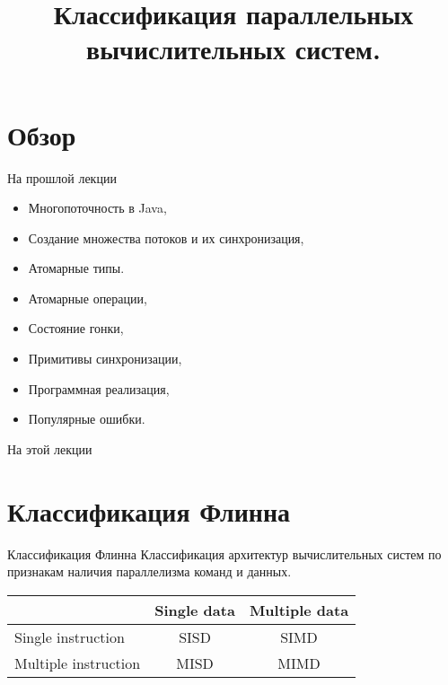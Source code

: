 

\title{Классификация параллельных вычислительных систем.}



\begin{frame}
\titlepage
\end{frame}

\section*{Обзор}

\begin{frame}{На прошлой лекции}
\begin{itemize}
\ifsbertech
    \item Многопоточность в Java,
    \item Создание множества потоков и их синхронизация,
    \item Атомарные типы.
\fi
\ifmipt
    \item Атомарные операции,
    \item Состояние гонки,
    \item Примитивы синхронизации,
    \item Программная реализация,
    \item Популярные ошибки.
\fi
\end{itemize}
\end{frame}

\begin{frame}{На этой лекции}
\tableofcontents
\end{frame}

\section{Классификация Флинна}

\begin{frame}{Классификация Флинна}
Классификация архитектур вычислительных систем по признакам наличия параллелизма
команд и данных.
\begin{table}[htp]
    \begin{center}
    \begin{tabular}{|l|c|c|}
        \hline
                                & Single data   & Multiple data \\
        \hline
        Single instruction      & SISD          & SIMD \\
        \hline
        Multiple instruction    & MISD          & MIMD \\
        \hline
    \end{tabular}
    \end{center}
\end{table}
\end{frame}

